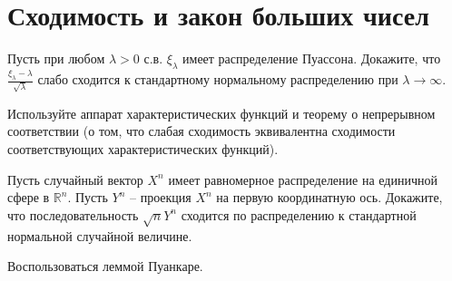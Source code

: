 \section{Сходимость и закон больших чисел}

\begin{problem}
Пусть при любом $\lambda >0$ с.в. $\xi _{\lambda } $ имеет распределение Пуассона. Докажите, что $\frac{\xi _{\lambda } -\lambda }{\sqrt{\lambda } } $ слабо сходится к стандартному нормальному распределению при $\lambda \to \infty $.

\begin{ordre}
 Используйте аппарат характеристических функций и теорему о непрерывном соответствии (о том, что слабая сходимость эквивалентна сходимости соответствующих характеристических функций).
 \end{ordre}
\end{problem}


\begin{problem}
Пусть случайный вектор $X^{n} $ имеет равномерное распределение на единичной сфере в ${\mathbb R}^{n} $. Пусть $Y^{n} $ -- проекция $X^{n} $ на первую координатную ось. Докажите, что последовательность $\sqrt{n} Y^{n} $ сходится по распределению к стандартной нормальной случайной величине.

\begin{ordre} 
 Воспользоваться леммой Пуанкаре.
\end{ordre}
\end{problem}


